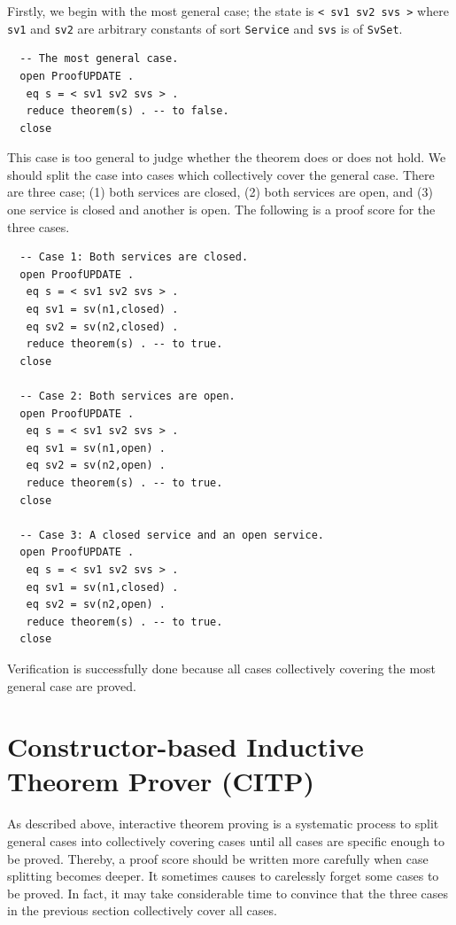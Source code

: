 \documentclass[12pt]{report}
\newcommand{\stt}[1]{{\small{\tt {#1}}}}
\begin{document}
Firstly, we begin with the most general case; the state is
\stt{<~sv1~sv2~svs~>} where {\tt sv1} and {\tt sv2} are arbitrary
constants of sort {\tt Service} and {\tt svs} is of {\tt SvSet}.
\small
\begin{verbatim}
  -- The most general case.
  open ProofUPDATE .
   eq s = < sv1 sv2 svs > .
   reduce theorem(s) . -- to false.
  close
\end{verbatim}
\normalsize
This case is too general to judge whether the theorem does or does not
hold.  We should split the case into cases which collectively cover
the general case.  There are three case; (1) both services are closed,
(2) both services are open, and (3) one service is closed and another
is open. The following is a proof score for the three cases.
\small
\begin{verbatim}
  -- Case 1: Both services are closed.  
  open ProofUPDATE .
   eq s = < sv1 sv2 svs > .  
   eq sv1 = sv(n1,closed) .  
   eq sv2 = sv(n2,closed) .
   reduce theorem(s) . -- to true.  
  close
  
  -- Case 2: Both services are open.
  open ProofUPDATE .
   eq s = < sv1 sv2 svs > .
   eq sv1 = sv(n1,open) .
   eq sv2 = sv(n2,open) .
   reduce theorem(s) . -- to true.
  close
  
  -- Case 3: A closed service and an open service.
  open ProofUPDATE .
   eq s = < sv1 sv2 svs > .
   eq sv1 = sv(n1,closed) .
   eq sv2 = sv(n2,open) .
   reduce theorem(s) . -- to true.
  close
\end{verbatim}
\normalsize
Verification is successfully done because all cases collectively covering
the most general case are proved.
\section{Constructor-based Inductive Theorem Prover (CITP)}
\label{sec:CITP}
As described above, interactive theorem proving is a systematic
process to split general cases into collectively covering cases until
all cases are specific enough to be proved. Thereby, a proof score should
be written more carefully when case splitting becomes deeper. It
sometimes causes to carelessly forget some cases to be proved. In
fact, it may take considerable time to convince that the three cases in
the previous section collectively cover all cases.
\end{document}
